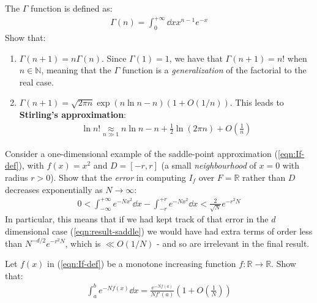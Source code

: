 \documentclass[../../main.tex]{subfiles}
\begin{document}
\begin{exo}
    The $\Gamma$ function is defined as:
\begin{align*}
        \Gamma(n) = \int_0^{+\infty} \dd{x} x^{n-1} e^{-x}
    \end{align*}
    Show that:
    \begin{enumerate}[label=\alph*.]
        \item $\Gamma(n+1) = n \Gamma(n)$. Since $\Gamma(1)=1$, we have that $\Gamma(n+1) = n!$ when $n \in \mathbb{N}$, meaning that the $\Gamma$ function is a \textit{generalization} of the factorial to the real case. 
        \item $\Gamma(n+1) = \sqrt{2 \pi n} \exp(n \ln n-n) (1+O(1/n))$. This leads to \textbf{Stirling's approximation}:
        \begin{align*}
            \ln n! \underset{n \gg 1}{\approx}  n \ln n - n + \frac{1}{2} \ln (2 \pi n) + O\left(\frac{1}{n} \right) 
        \end{align*} 
    \end{enumerate}
\end{exo}

\begin{exo}\label{ex:saddle-domain}
    Consider a one-dimensional example of the saddle-point approximation (\ref{eqn:If-def}), with $f(x) = x^2$ and $D = [-r, r]$ (a small \textit{neighbourhood} of $x=0$ with radius $r > 0$). Show that the \textit{error} in computing $I_f$ over $F = \mathbb{R}$ rather than $D$ decreases exponentially as $N \to \infty$:
    \begin{align*}
        0 < \int_{-\infty}^{+\infty} e^{-N x^2} \dd{x} - \int_{-r}^{+r} e^{-Nx^2} \dd{x} < \frac{2}{\sqrt{N}}  e^{-r^2 N}
    \end{align*}
    In particular, this means that if we had kept track of that error in the $d$ dimensional case (\ref{eqn:result-saddle}) we would have had extra terms of order less than $N^{-d/2} e^{-r^2 N}$, which is $\ll O(1/N)$ - and so are irrelevant in the final result.
\end{exo}

\begin{exo}
    Let $f(x)$ in (\ref{eqn:If-def}) be a monotone increasing function $f\colon \mathbb{R} \to \mathbb{R}$. Show that:
    \begin{align*}
        \int_a^b e^{-N f(x)} \dd{x} = \frac{e^{-N f(a)}}{N f'(a)} \left(1 + O\left(\frac{1}{N} \right)\right)
    \end{align*}
\end{exo}
\end{document}
